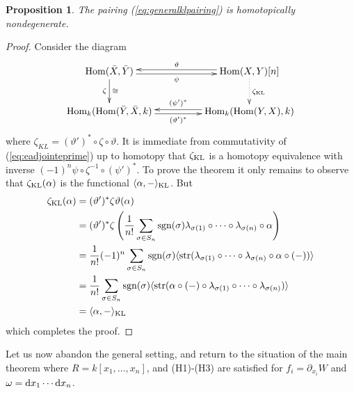 \documentclass{compositio}
\newtheorem{proposition}[theorem]{Proposition}
\theoremstyle{definition}
\numberwithin{equation}{section}
\def\Hom{\operatorname{Hom}}
\DeclareMathOperator{\str}{str}
\begin{document}
\begin{proposition}\label{prop:almostkltheorem} The pairing (\ref{eq:generalklpairing}) is homotopically nondegenerate.
\end{proposition}
\begin{proof} Consider the diagram
\[
\xymatrix@C+2pc{
\Hom(\bar{X},\bar{Y}) \ar[d]_-{\zeta}^-{\cong} \ar@<-0.5ex>[r]_-{\psi} & \Hom(X,Y)[n] \ar@<-0.5ex>[l]_-{\vartheta} \ar@{.>}[d]^{\zeta_{\textup{KL}}}\\
\Hom_k(\Hom(\bar{Y}, \bar{X},k) \ar@<-0.5ex>[r]_-{(\vartheta')^*} & \Hom_k( \Hom(Y,X), k) \ar@<-0.5ex>[l]_-{(\psi')^*}
}
\]
where $\zeta_{KL} = (\vartheta')^* \circ \zeta \circ \vartheta$. It is immediate from commutativity of (\ref{eq:eadjointeprime}) up to homotopy that $\zeta_{\textup{KL}}$ is a homotopy equivalence with inverse $(-1)^n \psi \circ \zeta^{-1} \circ (\psi')^*$. To prove the theorem it only remains to observe that $\zeta_{\textup{KL}}(\alpha)$ is the functional $\langle \alpha, - \rangle_{\textup{KL}}$. But
\begin{align*}
\zeta_{\textup{KL}}(\alpha) &= (\vartheta')^* \zeta \vartheta( \alpha )\\
&= (\vartheta')^* \zeta\left( \frac{1}{n!} \sum_{\sigma \in S_n} \textup{sgn}(\sigma) \lambda_{\sigma(1)} \circ \cdots \circ \lambda_{\sigma(n)} \circ \alpha \right)\\
&= \frac{1}{n!} (-1)^n \sum_{\sigma \in S_n} \textup{sgn}(\sigma) \langle \str( \lambda_{\sigma(1)} \circ \cdots \circ \lambda_{\sigma(n)} \circ \alpha \circ (-) ) \rangle\\
&= \frac{1}{n!} \sum_{\sigma \in S_n} \textup{sgn}(\sigma) \langle \str(  \alpha \circ (-) \circ \lambda_{\sigma(1)} \circ \cdots \circ \lambda_{\sigma(n)} ) \rangle\\
&= \langle \alpha, - \rangle_{\textup{KL}}
\end{align*}
which completes the proof.
\end{proof}

Let us now abandon the general setting, and return to the situation of the main theorem where $R = k[x_1,\ldots,x_n]$, and (H1)-(H3) are satisfied for $f_i = \partial_{x_i} W$ and $\omega = \mathrm{d} x_1 \cdots \mathrm{d} x_n$.
\end{document}
